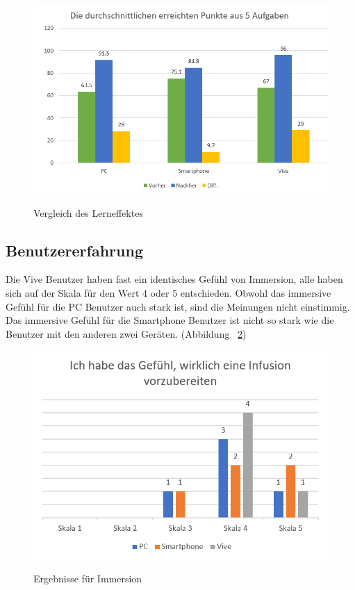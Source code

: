 \begin{figure}[ht]
\vspace*{1em}
\centering
\caption{Vergleich des Lerneffektes}
\includegraphics[width= \textwidth]{images/testErgebnisse.png}
\label{fig:testErgebnisse} 
\end{figure}

\subsection{Benutzererfahrung}

Die Vive Benutzer haben fast ein identisches Gefühl von Immersion, alle haben sich auf der Skala für den Wert 4 oder 5 entschieden. Obwohl das immersive Gefühl für die PC Benutzer auch stark ist, sind die Meinungen nicht einstimmig. Das immersive Gefühl für die Smartphone Benutzer ist nicht so stark wie die Benutzer mit den anderen zwei Geräten. (Abbildung ~\ref{fig:gefuehlWirklich})

\begin{figure}[ht]
\vspace*{1em}
\centering
\caption{Ergebnisse für Immersion}
\includegraphics[width= \textwidth]{images/gefuehlWirklich.png}
\label{fig:gefuehlWirklich} 
\end{figure}


